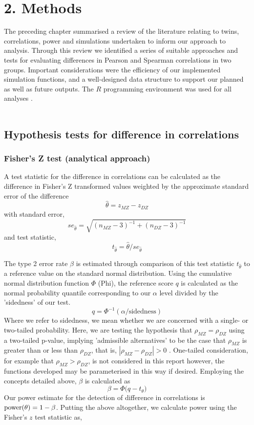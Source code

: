 \chapter*{2. Methods}
\setcounter{chapter}{2}
\setcounter{section}{0}

The preceding chapter summarised a review of the literature relating to twins, correlations, power and simulations undertaken to inform our approach to analysis.  Through this review we identified a series of suitable approaches and tests for evaluating differences in Pearson and Spearman correlations in two groups. Important considerations were the efficiency of our implemented simulation functions, and a well-designed data structure to support our planned as well as future outputs.  The $R$ programming environment was used for all analyses \cite{R2018}.
\\
\\
\section{Hypothesis tests for difference in correlations}
\subsection{Fisher's Z test (analytical approach)}
A test statistic for the difference in correlations can be calculated as the difference in Fisher's Z transformed values weighted by the approximate standard error of the difference \cite{Fisher1990,David1938}
$$\hat{\theta} = z_{MZ} - z_{DZ}$$
with standard error,
$$se_{\hat{\theta}}  = \sqrt{(n_{MZ}-3)^{-1}+(n_{DZ}-3)^{-1}} $$
and test statistic,
$$t_{\hat{\theta}}   = \hat{\theta} / se_\hat{\theta}$$ 

The type 2 error rate $\beta$ is estimated through comparison of this test statistic $t_{\hat{\theta}}$ to a reference value on the standard normal distribution.   Using the cumulative normal distribution function $\Phi$ (Phi), the reference score $q$ is calculated as the normal probability quantile corresponding to our $\alpha$ level divided by the 'sidedness' of our test. 
 $$q = \Phi^{-1}(\alpha/\text{sidedness})$$
Where we refer to sidedness, we mean whether we are concerned with a single- or two-tailed probability.  Here, we are testing the hypothesis that $\rho_{MZ} = \rho_{DZ}$ using a two-tailed p-value, implying 'admissible alternatives' to be the case that $\rho_{MZ}$ is greater than or less than $\rho_{DZ}$, that is, $|\rho_{MZ} - \rho_{DZ}| > 0$ \cite{David1938}.  One-tailed consideration, for example that $\rho_{MZ} > \rho_{DZ}$, is not considered in this report however, the functions developed may be parameterised in this way if desired. 
Employing the concepts detailed above, $\beta$ is calculated as 
$$\beta = \Phi \big( q - t_\theta \big)$$
Our power estimate for the detection of difference in correlations is $\operatorname{power}(\theta) = 1 - \beta$. Putting the above altogether, we calculate power using the Fisher's $z$ test statistic as,

